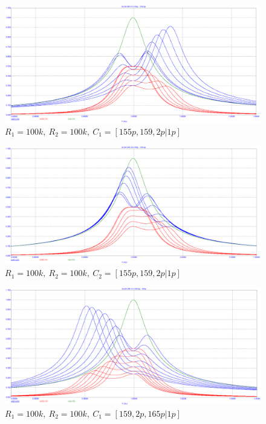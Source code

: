\documentclass[a4paper, 12pt]{article}%
\begin{document}
\begin{enumerate}
\newpage

\begin{figure}[h!]
\centering
\includegraphics[scale = 0.4]{images/plot2_5.png}
\caption{$R_1 = 100k, \: R_2 = 100k, \: C_1 = [155p, 159,2p | 1p]$}
\label{fig:Image1}
\end{figure}

\begin{figure}[h!]
\centering
\includegraphics[scale = 0.4]{images/plot2_6.png}
\caption{$R_1 = 100k, \: R_2 = 100k, \: C_2 = [155p, 159,2p | 1p]$}
\label{fig:Image1}
\end{figure}

\newpage

\begin{figure}[h!]
\centering
\includegraphics[scale = 0.4]{images/plot2_7.png}
\caption{$R_1 = 100k, \: R_2 = 100k, \: C_1 = [159,2p, 165p | 1p]$}
\label{fig:Image1}
\end{figure}


\end{enumerate}
\end{document}
